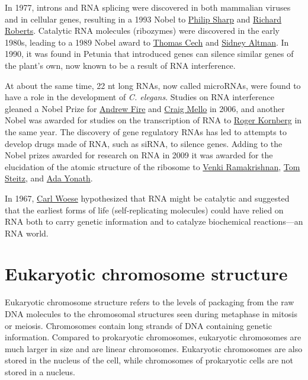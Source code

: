 In 1977, introns and RNA splicing were discovered in both mammalian viruses and in cellular genes, resulting in a 1993 Nobel to \href{https://en.wikipedia.org/wiki/Phillip_Allen_Sharp}{Philip Sharp} and \href{https://en.wikipedia.org/wiki/Richard_J._Roberts}{Richard Roberts}. Catalytic RNA molecules (ribozymes) were discovered in the early 1980s, leading to a 1989 Nobel award to \href{https://en.wikipedia.org/wiki/Thomas_Cech}{Thomas Cech} and \href{https://en.wikipedia.org/wiki/Sidney_Altman}{Sidney Altman}. In 1990, it was found in Petunia that introduced genes can silence similar genes of the plant's own, now known to be a result of RNA interference.

At about the same time, 22 nt long RNAs, now called microRNAs, were found to have a role in the development of \emph{C. elegans}. Studies on RNA interference gleaned a Nobel Prize for \href{https://en.wikipedia.org/wiki/Andrew_Fire}{Andrew Fire} and \href{https://en.wikipedia.org/wiki/Craig_Mello}{Craig Mello} in 2006, and another Nobel was awarded for studies on the transcription of RNA to \href{}{Roger Kornberg} in the same year. The discovery of gene regulatory RNAs has led to attempts to develop drugs made of RNA, such as siRNA, to silence genes. Adding to the Nobel prizes awarded for research on RNA in 2009 it was awarded for the elucidation of the atomic structure of the ribosome to \href{https://en.wikipedia.org/wiki/Venki_Ramakrishnan}{Venki Ramakrishnan}, \href{https://en.wikipedia.org/wiki/Thomas_A._Steitz}{Tom Steitz}, and \href{https://en.wikipedia.org/wiki/Ada_Yonath}{Ada Yonath}.

In 1967, \href{https://en.wikipedia.org/wiki/Carl_Woese}{Carl Woese} hypothesized that RNA might be catalytic and suggested that the earliest forms of life (self-replicating molecules) could have relied on RNA both to carry genetic information and to catalyze biochemical reactions---an RNA world.

\hypertarget{eukaryotic-chromosome-structure}{%
\chapter{Eukaryotic chromosome structure}\label{eukaryotic-chromosome-structure}}

Eukaryotic chromosome structure refers to the levels of packaging from the raw DNA molecules to the chromosomal structures seen during metaphase in mitosis or meiosis. Chromosomes contain long strands of DNA containing genetic information. Compared to prokaryotic chromosomes, eukaryotic chromosomes are much larger in size and are linear chromosomes. Eukaryotic chromosomes are also stored in the nucleus of the cell, while chromosomes of prokaryotic cells are not stored in a nucleus.

